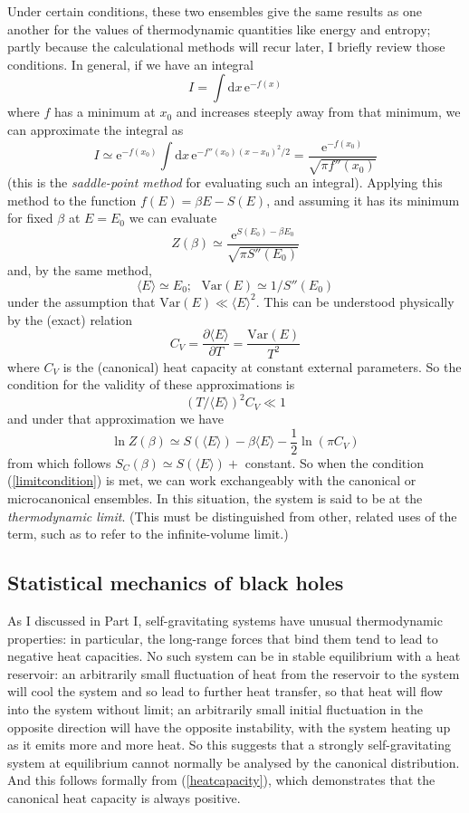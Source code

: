 \documentclass[12pt]{article}
\newcommand{\dr}[1]{\ensuremath{\mathrm{d} #1\,}}
\newcommand{\pbp}[2]{\ensuremath{\frac{\partial #1}{\partial #2}}}
\newcommand{\be}{\begin{equation}}
\newcommand{\ee}{\end{equation}}
\newcommand{\e}[1]{\mathrm{e}^{#1}}
\begin{document}
Under certain conditions, these two ensembles give the same results as one another for the values of thermodynamic quantities like energy and entropy; partly because the calculational methods will recur later, I briefly review those conditions. In general, if we have an integral
\be
I = \int \dr{x} \e{-f(x)}
\ee
where $f$ has a minimum at $x_0$ and increases steeply away from that minimum, we can approximate the integral as
\be
I \simeq \e{-f(x_0)}\int \dr{x}\e{-f''(x_0)(x-x_0)^2/2} = \frac{\e{-f(x_0)}}{\sqrt{\pi f''(x_0)}}
\ee
(this is the \emph{saddle-point method} for evaluating such an integral). Applying this method to the function $f(E)=\beta E- S(E)$, and assuming it has its minimum for fixed $\beta$ at $E=E_0$ we can evaluate
\be
Z(\beta) \simeq \frac{\e{S(E_0)-\beta E_0}}{\sqrt{\pi S''(E_0)}}
\ee
and, by the same method,
\be
\langle E \rangle \simeq E_0;\,\,\,\, \mbox{Var}(E) \simeq 1/S''(E_0)
\ee
under the assumption that 
$ \mbox{Var}(E)\ll \langle E \rangle ^2.$ This can be understood physically by the (exact) relation
\be \label{heatcapacity}
C_V = \pbp{\langle E \rangle}{T} = \frac{\mbox{Var}(E)}{T^2}
\ee
where $C_V$ is the (canonical) heat capacity at constant external parameters. So the condition for the validity of these approximations is 
\be
\label{limitcondition} (T/\langle E \rangle)^2 C_V \ll 1
\ee
 and under that approximation we have
\be
\ln Z(\beta) \simeq S(\langle E \rangle) - \beta \langle E \rangle - \frac{1}{2}\ln (\pi C_V)
\ee
from which follows $S_C(\beta) \simeq S(\langle E \rangle)+$ constant. So when the condition (\ref{limitcondition}) is met, we can work exchangeably with the canonical or microcanonical ensembles. In this situation, the system is said to be at the \emph{thermodynamic limit}. (This must be distinguished from other, related uses of the term, such as to refer to the infinite-volume limit.)





\subsection{Statistical mechanics of black holes}

As I discussed in Part I, self-gravitating systems have unusual thermodynamic properties: in particular, the long-range forces that bind them tend to lead to negative heat capacities. No such system can be in stable equilibrium with a heat reservoir: an arbitrarily small fluctuation of heat from the reservoir to the system will cool the system and so lead to further heat transfer, so that heat will flow into the system without limit; an arbitrarily small initial fluctuation in the opposite direction will have the opposite instability, with the system heating up as it emits more and more heat. So this suggests that a strongly self-gravitating system at equilibrium cannot normally be analysed by the canonical distribution. And this follows formally from (\ref{heatcapacity}), which demonstrates that the canonical heat capacity is always positive.
\end{document}
